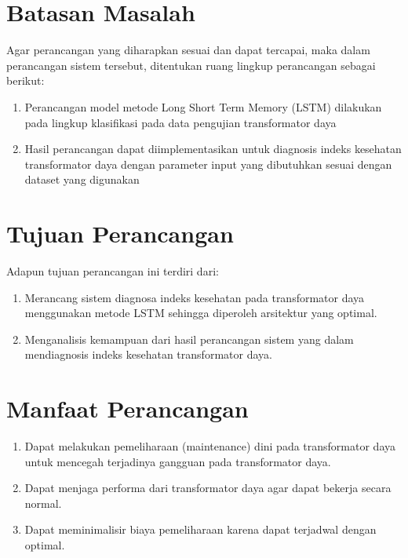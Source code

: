 
\section{Batasan Masalah}
Agar perancangan yang diharapkan sesuai dan dapat tercapai, maka dalam perancangan sistem tersebut, ditentukan ruang lingkup perancangan sebagai berikut:
\begin{enumerate}
	\item Perancangan model metode Long Short Term Memory (LSTM) dilakukan pada lingkup klasifikasi pada data pengujian transformator daya
	\item Hasil perancangan dapat diimplementasikan untuk diagnosis indeks kesehatan transformator daya dengan parameter input yang dibutuhkan sesuai dengan dataset yang digunakan
\end{enumerate}

\section{Tujuan Perancangan}
Adapun tujuan perancangan ini terdiri dari:
\begin{enumerate}
	\item Merancang sistem diagnosa indeks kesehatan pada transformator daya menggunakan metode LSTM sehingga diperoleh arsitektur yang optimal.
	\item Menganalisis kemampuan dari hasil perancangan sistem yang dalam mendiagnosis indeks kesehatan transformator daya.
\end{enumerate}


\section{Manfaat Perancangan}
\begin{enumerate}
	\item Dapat melakukan pemeliharaan (maintenance) dini pada transformator daya untuk mencegah terjadinya gangguan pada transformator daya.
	\item Dapat menjaga performa dari transformator daya agar dapat bekerja secara normal.
	\item Dapat meminimalisir biaya pemeliharaan karena dapat terjadwal dengan optimal.
\end{enumerate}

